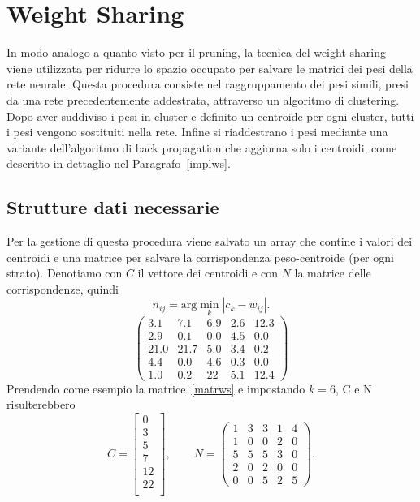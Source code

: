 \documentclass[11pt,a4paper,twoside,
openright]{book}
\begin{document}
\section{Weight Sharing}
In modo analogo a quanto visto per il pruning, la tecnica del weight sharing~\cite{han2015compression} viene utilizzata per ridurre lo spazio occupato per salvare le matrici dei pesi della rete neurale. Questa procedura consiste nel raggruppamento dei pesi simili, presi da una rete precedentemente addestrata, attraverso un algoritmo di clustering. Dopo aver suddiviso i pesi in cluster e definito un centroide per ogni cluster, tutti i pesi vengono sostituiti nella rete. Infine si riaddestrano i pesi mediante una variante dell'algoritmo di back propagation che aggiorna solo i centroidi, come descritto in dettaglio nel Paragrafo~\ref{implws}.

\subsection{Strutture dati necessarie}
Per la gestione di questa procedura viene salvato un array che contine i valori dei centroidi e una matrice per salvare la corrispondenza peso-centroide (per ogni strato).
Denotiamo con $C$ il vettore dei centroidi e con $N$ la matrice delle corrispondenze, quindi
\begin{equation}
n_{ij} = \text{arg}\min\limits_{k}|c_{k}-w_{ij}|.
\label{ws}
\end{equation}
\begin{equation}
\begin{pmatrix} 
3.1 & 7.1 & 6.9 & 2.6 & 12.3\\
2.9 & 0.1 & 0.0 & 4.5 & 0.0\\
21.0 & 21.7 & 5.0 & 3.4 & 0.2\\
4.4 & 0.0 & 4.6 & 0.3 & 0.0\\
1.0 & 0.2 & 22 & 5.1 & 12.4 
\end{pmatrix}
\label{matrws}
\end{equation}
Prendendo come esempio la matrice~\ref{matrws} e impostando $k=6$, C e N risulterebbero
\begin{equation}
C=
\begin{bmatrix} 
	0  \\
	3  \\
	5  \\
	7  \\
	12 \\
	22 \\
\end{bmatrix}, \qquad
N=
\begin{pmatrix} 
1 & 3 & 3 & 1 & 4\\
1 & 0 & 0 & 2 & 0\\
5 & 5 & 5 & 3 & 0\\
2 & 0 & 2 & 0 & 0\\
0 & 0 & 5 & 2 & 5 
\end{pmatrix}.
\label{NC}
\end{equation}
\end{document}
